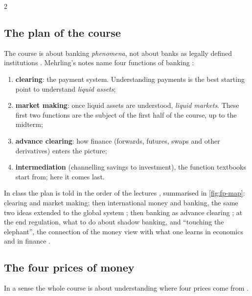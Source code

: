 \begin{paracol}{2}
\subsection{The plan of the course}
The course is about banking \emph{phenomena}, not about banks as legally defined institutions . Mehrling's notes
name four functions of banking :
\begin{enumerate}
  \item \textbf{clearing}: the payment system. Understanding payments is the best starting point to understand
        \emph{liquid assets};
  \item \textbf{market making}: once liquid assets are understood, \emph{liquid markets}. These first two functions are the
        subject of the first half of the course, up to the midterm;
  \item \textbf{advance clearing}: how finance (forwards, futures, swaps and other derivatives) enters the picture;
  \item \textbf{intermediation} (channelling savings to investment), the function textbooks start from; here it comes last.
\end{enumerate}
In class the plan is told in the order of the lectures , summarised in \cref{fig:fp-map}: clearing and
market making; then international money and banking, the same two ideas extended to the global system ;
then banking as advance clearing ; at the end regulation, what to do about shadow banking, and ``touching the
elephant'', the connection of the money view with what one learns in economics and in finance .

\subsection{The four prices of money}
In a sense the whole course is about understanding where four prices come from .


\end{paracol}
